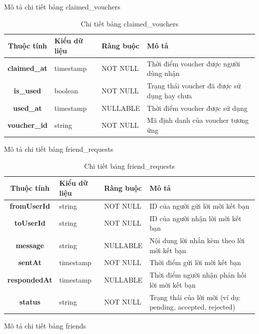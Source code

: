 \documentclass[../DoAn.tex]{subfiles}
\begin{document}
Mô tả chi tiết bảng claimed\_vouchers 
\begin{table}[H]
\centering
\begin{tabular}{|c|p{3.5cm}|l|p{6cm}|}
\hline
\textbf{Thuộc tính} & \textbf{Kiểu dữ liệu} & \textbf{Ràng buộc} & \textbf{Mô tả} \\ \hline
\textbf{claimed\_at} & timestamp & NOT NULL & Thời điểm voucher được người dùng nhận \\ \hline
\textbf{is\_used} & boolean & NOT NULL & Trạng thái voucher đã được sử dụng hay chưa \\ \hline
\textbf{used\_at} & timestamp & NULLABLE & Thời điểm voucher được sử dụng  \\ \hline
\textbf{voucher\_id} & string & NOT NULL & Mã định danh của voucher tương ứng \\ \hline
\end{tabular}
\caption{Chi tiết bảng claimed\_vouchers}
\label{tab:claimedVouchersTable}
\end{table}

Mô tả chi tiết bảng friend\_requests
\begin{table}[H]
\centering
\begin{tabular}{|c|p{3.5cm}|l|p{6cm}|}
\hline
\textbf{Thuộc tính} & \textbf{Kiểu dữ liệu} & \textbf{Ràng buộc} & \textbf{Mô tả} \\ \hline
\textbf{fromUserId} & string & NOT NULL & ID của người gửi lời mời kết bạn \\ \hline
\textbf{toUserId} & string & NOT NULL & ID của người nhận lời mời kết bạn \\ \hline
\textbf{message} & string & NULLABLE & Nội dung lời nhắn kèm theo lời mời kết bạn \\ \hline
\textbf{sentAt} & timestamp & NOT NULL & Thời điểm gửi lời mời kết bạn \\ \hline
\textbf{respondedAt} & timestamp & NULLABLE & Thời điểm người nhận phản hồi lời mời kết bạn \\ \hline
\textbf{status} & string & NOT NULL & Trạng thái của lời mời (ví dụ: pending, accepted, rejected) \\ \hline
\end{tabular}
\caption{Chi tiết bảng friend\_requests}
\label{tab:friendRequestsTable}
\end{table}
\FloatBarrier
\newpage
Mô tả chi tiết bảng friends
\end{document}
